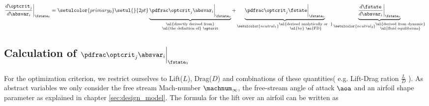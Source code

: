 \documentclass[../main.tex]{subfiles}
\begin{document}
\begin{align}\label{eq:sensitivity_startingpoint}
\DoptcritJBYabsvarI\bigg\rvert_{\fstate_0}=\setulcolor{primary_0}\setul{}{2pt}
\underbrace{\PoptcritJBYabsvarI\bigg\rvert_{\fstate_0}}_{
                                                        \substack{
                                                                 \text{\ul{directly derived from}} \\
                                                                 \text{\ul{the definition of} $\optcrit$}
                                                                 } 
                                                        }  +
\underbrace{\PoptcritJBYfstate\bigg\rvert_{\fstate_0}}_ {\setulcolor{neutral_1}
                                                        \substack{
                                                                 \text{\ul{derived analytically or~~}}\\
                                                                 \text{\ul{by} \ac{FD}}
                                                                 }
                                                        }
\underbrace{\DfstateBYabsvarI\bigg\rvert_{\fstate_0}}_  {\setulcolor{neutral_2}
                                                        \substack{
                                                                 \text{\ul{derived from dynamic}}\\
                                                                 \text{\ul{fluid equilibrium}}
                                                                 }
                                                        }
\end{align}
\subsection{Calculation of $\PoptcritJBYabsvarI\bigg\rvert_{\fstate_0}$}
For the optimization criterion, we restrict ourselves to Lift($L$), Drag($D$) and combinations of  these quantities( e.g. Lift-Drag ration $\frac{L}{D}$ ). As abstract variables we only consider the free stream Mach-number $\machnum_{\infty}$, the free-stream angle of attack $\aoa$ and an airfoil shape parameter as explained in chapter \ref{sec:design_model}.
The formula for the lift over an airfoil can be written as
\end{document}
